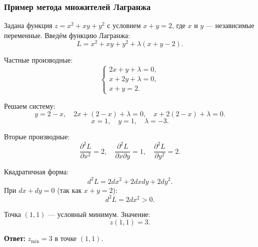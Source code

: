 \subsubsection*{Пример метода множителей Лагранжа}
Задана функция $z = x^2 + xy + y^2$ с условием $x + y = 2$, где $x$ и $y$ — независимые переменные. Введём функцию Лагранжа:
\[
L = x^2 + xy + y^2 + \lambda(x + y - 2).
\]

Частные производные:
\[
\begin{cases}
	2x + y + \lambda = 0, \\
	x + 2y + \lambda = 0, \\
	x + y = 2.
\end{cases}
\]

Решаем систему:
\[
y = 2 - x, \quad 2x + (2 - x) + \lambda = 0, \quad x + 2(2 - x) + \lambda = 0.
\]
\[
x = 1, \quad y = 1, \quad \lambda = -3.
\]

Вторые производные:
\[
\frac{\partial^2 L}{\partial x^2} = 2, \quad \frac{\partial^2 L}{\partial x \partial y} = 1, \quad \frac{\partial^2 L}{\partial y^2} = 2.
\]

Квадратичная форма:
\[
d^2 L = 2 dx^2 + 2 dx dy + 2 dy^2.
\]
При $dx + dy = 0$ (так как $x + y = 2$):
\[
d^2 L = 2 dx^2 > 0.
\]

Точка $(1, 1)$ — условный минимум. Значение:
\[
z(1, 1) = 3.
\]

\textbf{Ответ:} $z_{\text{min}} = 3$ в точке $(1, 1)$.